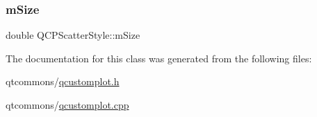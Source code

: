 \subsubsection{\texorpdfstring{mSize}{mSize}}
{\footnotesize\ttfamily double Q\+C\+P\+Scatter\+Style\+::m\+Size\hspace{0.3cm}{\ttfamily [protected]}}



The documentation for this class was generated from the following files\+:\begin{DoxyCompactItemize}
\item 
qtcommons/\mbox{\hyperlink{qcustomplot_8h}{qcustomplot.\+h}}\item 
qtcommons/\mbox{\hyperlink{qcustomplot_8cpp}{qcustomplot.\+cpp}}\end{DoxyCompactItemize}

